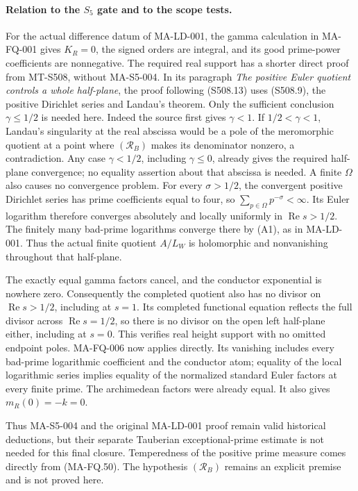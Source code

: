 \paragraph{Relation to the $S_5$ gate and to the scope tests.}
For the actual difference datum of MA-LD-001,
the gamma calculation in MA-FQ-001 gives $K_R=0$,
the signed orders are integral, and its good
prime-power coefficients are nonnegative.
The required real support has a shorter direct
proof from MT-S508, without MA-S5-004.
In its paragraph \emph{The positive Euler quotient
controls a whole half-plane}, the proof following
(S508.13) uses (S508.9), the positive Dirichlet
series and Landau's theorem.  Only the sufficient
conclusion $\gamma\le1/2$ is needed here.
Indeed the source first gives $\gamma<1$.
If $1/2<\gamma<1$, Landau's singularity at the real
abscissa would be a pole of the meromorphic quotient
at a point where $(\mathcal R_B)$ makes its
denominator nonzero, a contradiction.
Any case $\gamma<1/2$, including $\gamma\le0$,
already gives the required half-plane convergence;
no equality assertion about that abscissa is needed.
A finite $\Omega$ also causes no convergence problem.
For every $\sigma>1/2$, the convergent positive
Dirichlet series has prime coefficients equal to
four, so $\sum_{p\in\Omega}p^{-\sigma}<\infty$.
Its Euler logarithm therefore converges absolutely
and locally uniformly in $\operatorname{Re}s>1/2$.
The finitely many bad-prime logarithms converge
there by (A1), as in MA-LD-001. Thus the actual
finite quotient $A/L_W$ is holomorphic and
nonvanishing throughout that half-plane.

The exactly equal gamma factors cancel, and
the conductor exponential is nowhere zero.
Consequently the completed quotient also has
no divisor on $\operatorname{Re}s>1/2$,
including at $s=1$. Its completed functional
equation reflects the full divisor across
$\operatorname{Re}s=1/2$, so there is no divisor
on the open left half-plane either, including
at $s=0$. This verifies real height support
with no omitted endpoint poles. MA-FQ-006 now
applies directly. Its vanishing includes every
bad-prime logarithmic coefficient and the
conductor atom; equality of the local logarithmic
series implies equality of the normalized
standard Euler factors at every finite prime.
The archimedean factors were already equal.
It also gives $m_R(0)=-k=0$.

Thus MA-S5-004 and the original MA-LD-001
proof remain valid historical deductions, but
their separate Tauberian exceptional-prime
estimate is not needed for this final closure.
Temperedness of the positive prime measure
comes directly from (MA-FQ.50).
The hypothesis $(\mathcal R_B)$ remains an
explicit premise and is not proved here.

